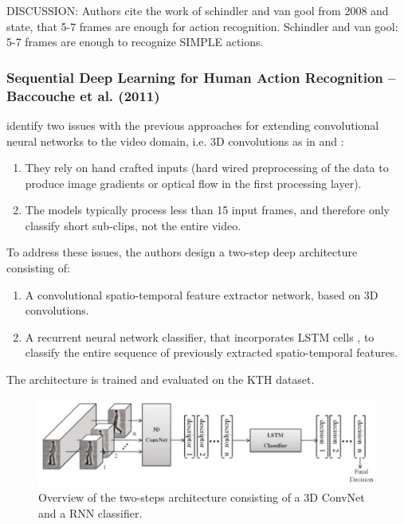 DISCUSSION: Authors cite the work of schindler and van gool from 2008 and state, that 5-7 frames are enough for action recognition.
Schindler and van gool: 5-7 frames are enough to recognize SIMPLE actions.

\subsubsection{Sequential Deep Learning for Human Action Recognition -- Baccouche et al. (2011)}
\textcite{baccouche_sequential_2011} identify two issues with the previous approaches for extending convolutional neural networks to the video domain, i.e. 3D convolutions as in \cite{ji_3d_2013} and \cite{kim_human_2007}:

\begin{enumerate}
    \item They rely on hand crafted inputs (hard wired preprocessing of the data to produce image gradients or optical flow in the first processing layer).
    \item The models typically process less than 15 input frames, and therefore only classify short sub-clips, not the entire video.
\end{enumerate}

To address these issues, the authors design a two-step deep architecture consisting of:

\begin{enumerate}
    \item A convolutional spatio-temporal feature extractor network, based on 3D convolutions.
    \item A recurrent neural network classifier, that incorporates LSTM cells \cite{hochreiter_long_1997}, to classify the entire sequence of previously extracted spatio-temporal features.
\end{enumerate}

The architecture is trained and evaluated on the KTH dataset.

\begin{figure}[H]
    \centering
    \includegraphics[width=\textwidth]{img_deep/sequentialdeep_overview.png}
    \caption{Overview of the two-steps architecture consisting of a 3D ConvNet and a RNN classifier. \cite{baccouche_sequential_2011}}
    \label{fig:sequentialdeep_overview}
\end{figure}

